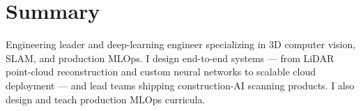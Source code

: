 \section{Summary}
\vspace{2pt}
Engineering leader and deep-learning engineer specializing in 3D computer vision, SLAM, and
production MLOps. I design end-to-end systems --- from LiDAR point-cloud reconstruction and
custom neural networks to scalable cloud deployment --- and lead teams shipping construction-AI
scanning products. I also design and teach production MLOps curricula.
